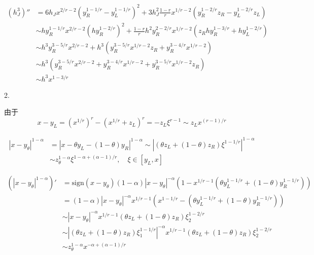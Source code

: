 \documentclass{ctexart}
\begin{document}
\begin{equation}
    \begin{aligned}
        (h_J^3)'' & = 6 h_J x^{2/r-2}(y_R^{1-1/r}-y_L^{1-1/r})^2 + 3 h_J^2 \frac{1-r}{r} x^{1/r-2}(y_R^{1-2/r}z_R-y_L^{1-2/r}z_L)             \\
                  & \sim h y_R^{1-1/r} x^{2/r-2} (hy_R^{1-2/r})^2 + \frac{1-r}{r} h^2 y_R^{2-2/r} x^{1/r-2}(z_R h y_R^{1-3/r} + hy_L^{1-2/r}) \\
                  & \sim h^3 y_R^{3-5/r} x^{2/r-2} + h^3 (y_R^{3-5/r}x^{1/r-2}z_R + y_R^{3-4/r} x^{1/r-2})                                    \\
                  & \sim h^3 ( y_R^{3-5/r} x^{2/r-2} + y_R^{3-4/r} x^{1/r-2} + y_R^{3-5/r}x^{1/r-2}z_R)                                       \\
                  & \sim  h^3 x^{1-3/r}
    \end{aligned}
\end{equation}


2.

由于
\begin{equation}
    x-y_L = (x^{1/r})^{r} - (x^{1/r} + z_L)^r = -z_L \xi^{r-1} \sim z_L x^{(r-1)/r}
\end{equation}

\begin{equation}
    \begin{aligned}
        |x-y_\theta|^{1-\alpha} & = |x-\theta y_L - (1-\theta) y_R |^{1-\alpha} \sim | (\theta z_L + (1-\theta) z_R) \xi^{1-1/r} |^{1-\alpha} \\
                                & \sim z_\theta^{1-\alpha} \xi^{1-\alpha + (\alpha-1)/r}, \quad \xi\in [y_L, x]
    \end{aligned}
\end{equation}

\begin{equation}
    \begin{aligned}
        (|x-y_\theta|^{1-\alpha})' & = \text{sign}(x-y_\theta)(1-\alpha)|x-y_\theta|^{-\alpha}(1-x^{1/r-1}(\theta y_L^{1-1/r} + (1-\theta)y_R^{1-1/r}))  \\
                                   & = (1-\alpha)|x-y_\theta|^{-\alpha}x^{1/r-1} (x^{1-1/r} - (\theta y_L^{1-1/r} + (1-\theta)y_R^{1-1/r}))              \\
                                   & \sim |x-y_\theta|^{-\alpha} x^{1/r-1} (\theta z_L + (1-\theta) z_R) \xi_2^{1-2/r}                                   \\
                                   & \sim | (\theta z_L + (1-\theta) z_R) \xi_1^{1-1/r} |^{-\alpha} x^{1/r-1} (\theta z_L + (1-\theta) z_R)\xi_2^{1-2/r} \\
                                   & \sim z_\theta^{1-\alpha} x^{-\alpha + (\alpha-1)/r}
    \end{aligned}
\end{equation}
\end{document}
